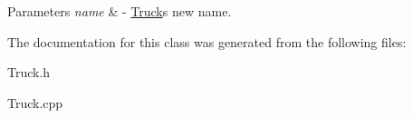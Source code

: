 \begin{DoxyParams}{Parameters}
{\em name} & -\/ \hyperlink{class_truck}{Truck}\textquotesingle{}s new name. \\
\hline
\end{DoxyParams}


The documentation for this class was generated from the following files\+:\begin{DoxyCompactItemize}
\item 
Truck.\+h\item 
Truck.\+cpp\end{DoxyCompactItemize}
